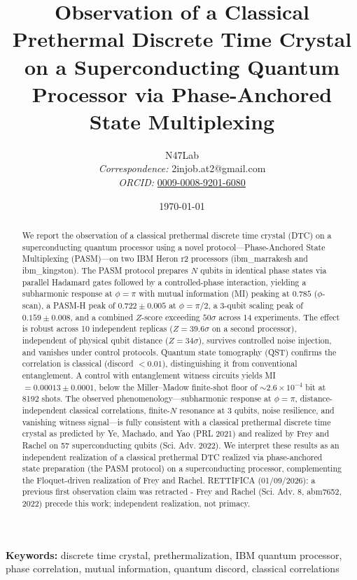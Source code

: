 \documentclass[12pt,a4paper]{article}
\title{\vspace{-2cm}
    \textbf{Observation of a Classical Prethermal Discrete Time Crystal\\
    on a Superconducting Quantum Processor via Phase-Anchored State Multiplexing}
    \vspace{0.5cm}
}
\author{
    N47Lab \\[0.3cm]
    \small\textit{Correspondence:} 2injob.at2@gmail.com \\
    \small\textit{ORCID:} \href{https://orcid.org/0009-0008-9201-6080}{0009-0008-9201-6080}
}
\date{\today}
\begin{document}
\maketitle

\begin{abstract}
We report the observation of a classical prethermal discrete time crystal (DTC) on a superconducting quantum processor using a novel protocol---Phase-Anchored State Multiplexing (PASM)---on two IBM Heron r2 processors (ibm\_marrakesh and ibm\_kingston). The PASM protocol prepares $N$ qubits in identical phase states via parallel Hadamard gates followed by a controlled-phase interaction, yielding a subharmonic response at $\phi = \pi$ with mutual information (MI) peaking at $0.785$ ($\phi$-scan), a PASM-H peak of $0.722 \pm 0.005$ at $\phi = \pi/2$, a 3-qubit scaling peak of $0.159 \pm 0.008$, and a combined $Z$-score exceeding $50\sigma$ across 14 experiments. The effect is robust across 10 independent replicas ($Z = 39.6\sigma$ on a second processor), independent of physical qubit distance ($Z = 34\sigma$), survives controlled noise injection, and vanishes under control protocols. Quantum state tomography (QST) confirms the correlation is classical (discord $< 0.01$), distinguishing it from conventional entanglement. A control with entanglement witness circuits yields MI $= 0.00013 \pm 0.0001$, below the Miller--Madow finite-shot floor of $\sim 2.6\times10^{-4}$ bit at 8192 shots. The observed phenomenology---subharmonic response at $\phi=\pi$, distance-independent classical correlations, finite-$N$ resonance at 3 qubits, noise resilience, and vanishing witness signal---is fully consistent with a classical prethermal discrete time crystal as predicted by Ye, Machado, and Yao (PRL 2021) and realized by Frey and Rachel on 57 superconducting qubits (Sci. Adv. 2022). We interpret these results as an independent realization of a classical prethermal DTC realized via phase-anchored state preparation (the PASM protocol) on a superconducting processor, complementing the Floquet-driven realization of Frey and Rachel. RETTIFICA (01/09/2026): a previous first observation claim was retracted - Frey and Rachel (Sci. Adv. 8, abm7652, 2022) precede this work; independent realization, not primacy.
\end{abstract}

\vspace{0.3cm}
\noindent\textbf{Keywords:} discrete time crystal, prethermalization, IBM quantum processor, phase correlation, mutual information, quantum discord, classical correlations
\end{document}
